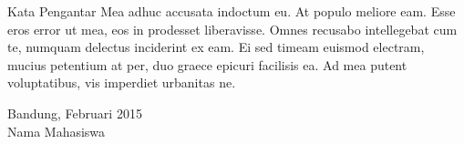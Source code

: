 \documentclass[12pt,a4paper,oneside]{book}
\numberwithin{equation}{chapter}
\begin{document}

\begin{custompage}{Kata Pengantar}
 Mea adhuc accusata indoctum eu. At populo meliore eam. Esse eros error ut mea, eos in prodesset liberavisse. Omnes recusabo intellegebat cum te, numquam delectus inciderint ex eam. Ei sed timeam euismod electram, mucius petentium at per, duo graece epicuri facilisis ea. Ad mea putent voluptatibus, vis imperdiet urbanitas ne.

\begin{flushright}
Bandung, Februari 2015\\[2cm]
Nama Mahasiswa
\end{flushright} 
\end{custompage}

    
\tableofcontents
\newpage\listoftables{}
\newpage\listoffigures{}

\mainmatter




\backmatter


\appendix

\end{document}

